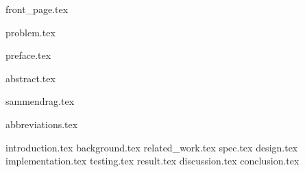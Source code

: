\documentclass[pdftex,10pt,b5paper,twoside]{book}
\begin{document}
{front_page.tex}

{problem.tex}

\setcounter{page}{1}
\setcounter{tocdepth}{3}

\let\cleardoublepage\clearpage
{preface.tex}

\let\cleardoublepage\clearpage
{abstract.tex}

\let\cleardoublepage\clearpage
{sammendrag.tex}

\let\cleardoublepage\clearpage
{abbreviations.tex}

\let\cleardoublepage\clearpage
\tableofcontents
{}

\let\cleardoublepage\clearpage
\listoffigures                                  
{}
\cleardoublepage


\listoftables                                   
{}
\cleardoublepage

\setcounter{page}{1}
\fancyhead[R]{\itshape \nouppercase \rightmark}
\pagestyle{fancy}

\let\cleardoublepage\clearpage
{introduction.tex}
\let\cleardoublepage\clearpage
{background.tex}
\let\cleardoublepage\clearpage
{related_work.tex}
\let\cleardoublepage\clearpage
{spec.tex}
\let\cleardoublepage\clearpage
{design.tex}
\let\cleardoublepage\clearpage
{implementation.tex}
\let\cleardoublepage\clearpage
{testing.tex}
\let\cleardoublepage\clearpage
{result.tex}
\let\cleardoublepage\clearpage
{discussion.tex}
\let\cleardoublepage\clearpage
{conclusion.tex}


\let\cleardoublepage\clearpage
\begin{appendices}
\end{appendices}

\let\cleardoublepage\clearpage
\begin{sloppypar}
\printbibliography
\end{sloppypar}
\end{document}
